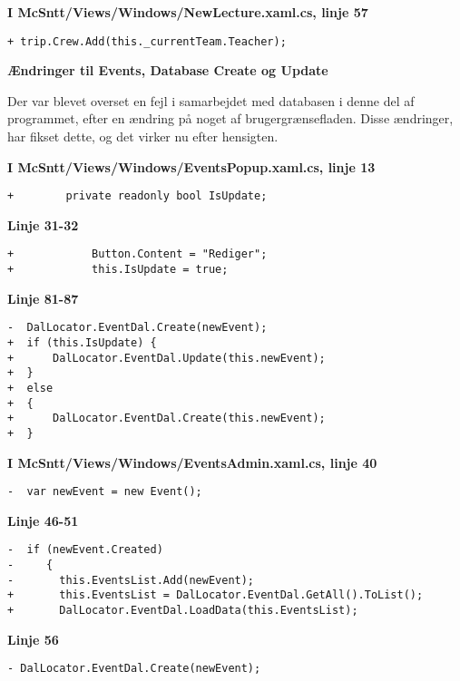 \documentclass[article,a4paper,11pt,onseside,final]{memoir}
\begin{document}
\lstset{firstnumber=57}
\textbf{I McSntt/Views/Windows/NewLecture.xaml.cs, linje 57}
\begin{lstlisting}[frame=single, caption=NewLecture.xaml.cs ændringer, label=fntpg-cb]
+ trip.Crew.Add(this._currentTeam.Teacher);
\end{lstlisting}

\textbf{Ændringer til Events, Database Create og Update}

Der var blevet overset en fejl i samarbejdet med databasen i denne del af programmet, efter en ændring på noget af brugergrænsefladen.
Disse ændringer, har fikset dette, og det virker nu efter hensigten.

\lstset{firstnumber=13}
\textbf{I McSntt/Views/Windows/EventsPopup.xaml.cs, linje 13}
\begin{lstlisting}[frame=single, caption=EventsPopup.xaml.cs ændringer, label=fntpg-cb]
+        private readonly bool IsUpdate;
\end{lstlisting}
\lstset{firstnumber=31}
\textbf{Linje 31-32}
\begin{lstlisting}[frame=single, label=fntpg-cb]
+            Button.Content = "Rediger";
+            this.IsUpdate = true;
\end{lstlisting}

\textbf{Linje 81-87}
\begin{lstlisting}[frame=single, label=fntpg-cb]
-  DalLocator.EventDal.Create(newEvent);
+  if (this.IsUpdate) {
+      DalLocator.EventDal.Update(this.newEvent);
+  }
+  else
+  {
+      DalLocator.EventDal.Create(this.newEvent);
+  }
\end{lstlisting}

\lstset{firstnumber=40}
\textbf{I McSntt/Views/Windows/EventsAdmin.xaml.cs, linje 40}
\begin{lstlisting}[frame=single, caption=EventsPopup.xaml.cs ændringer, label=fntpg-cb]
-  var newEvent = new Event();
\end{lstlisting}


\lstset{firstnumber=46}
\textbf{Linje 46-51}
\begin{lstlisting}[frame=single, label=fntpg-cb]
-  if (newEvent.Created)
-     {
-       this.EventsList.Add(newEvent);
+       this.EventsList = DalLocator.EventDal.GetAll().ToList();
+       DalLocator.EventDal.LoadData(this.EventsList);
\end{lstlisting}

\lstset{firstnumber=56}
\textbf{Linje 56}
\begin{lstlisting}[frame=single, label=fntpg-cb]
- DalLocator.EventDal.Create(newEvent);
\end{lstlisting}
\end{document}

